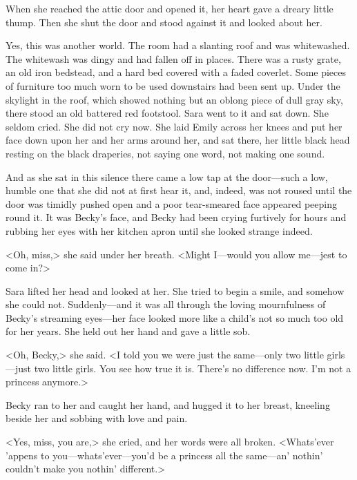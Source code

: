 When she reached the attic door and opened it, her heart gave a dreary little thump. Then she shut the door and stood against it and looked about her.

Yes, this was another world. The room had a slanting roof and was whitewashed. The whitewash was dingy and had fallen off in places. There was a rusty grate, an old iron bedstead, and a hard bed covered with a faded coverlet. Some pieces of furniture too much worn to be used downstairs had been sent up. Under the skylight in the roof, which showed nothing but an oblong piece of dull gray sky, there stood an old battered red footstool. Sara went to it and sat down. She seldom cried. She did not cry now. She laid Emily across her knees and put her face down upon her and her arms around her, and sat there, her little black head resting on the black draperies, not saying one word, not making one sound.

And as she sat in this silence there came a low tap at the door—such a low, humble one that she did not at first hear it, and, indeed, was not roused until the door was timidly pushed open and a poor tear-smeared face appeared peeping round it. It was Becky's face, and Becky had been crying furtively for hours and rubbing her eyes with her kitchen apron until she looked strange indeed.

<Oh, miss,> she said under her breath. <Might I—would you allow me—jest to come in?>

Sara lifted her head and looked at her. She tried to begin a smile, and somehow she could not. Suddenly—and it was all through the loving mournfulness of Becky's streaming eyes—her face looked more like a child's not so much too old for her years. She held out her hand and gave a little sob.

<Oh, Becky,> she said. <I told you we were just the same—only two little girls—just two little girls. You see how true it is. There's no difference now. I'm not a princess anymore.>

Becky ran to her and caught her hand, and hugged it to her breast, kneeling beside her and sobbing with love and pain.

<Yes, miss, you are,> she cried, and her words were all broken. <Whats'ever 'appens to you—whats'ever—you'd be a princess all the same—an' nothin' couldn't make you nothin' different.>